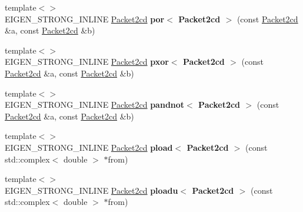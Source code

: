 \begin{DoxyCompactItemize}
\item 
\mbox{\label{namespace_eigen_1_1internal_a4d3f230cbe99c22bea02ad08eef996dc}} 
{\footnotesize template$<$$>$ }\\E\+I\+G\+E\+N\+\_\+\+S\+T\+R\+O\+N\+G\+\_\+\+I\+N\+L\+I\+NE \hyperlink{struct_eigen_1_1internal_1_1_packet2cd}{Packet2cd} {\bfseries por$<$ Packet2cd $>$} (const \hyperlink{struct_eigen_1_1internal_1_1_packet2cd}{Packet2cd} \&a, const \hyperlink{struct_eigen_1_1internal_1_1_packet2cd}{Packet2cd} \&b)
\item 
\mbox{\label{namespace_eigen_1_1internal_aad85473d2b77acec45ef80ca3cb8cb38}} 
{\footnotesize template$<$$>$ }\\E\+I\+G\+E\+N\+\_\+\+S\+T\+R\+O\+N\+G\+\_\+\+I\+N\+L\+I\+NE \hyperlink{struct_eigen_1_1internal_1_1_packet2cd}{Packet2cd} {\bfseries pxor$<$ Packet2cd $>$} (const \hyperlink{struct_eigen_1_1internal_1_1_packet2cd}{Packet2cd} \&a, const \hyperlink{struct_eigen_1_1internal_1_1_packet2cd}{Packet2cd} \&b)
\item 
\mbox{\label{namespace_eigen_1_1internal_a7581b24af7c62b141e9af806ea2d6f14}} 
{\footnotesize template$<$$>$ }\\E\+I\+G\+E\+N\+\_\+\+S\+T\+R\+O\+N\+G\+\_\+\+I\+N\+L\+I\+NE \hyperlink{struct_eigen_1_1internal_1_1_packet2cd}{Packet2cd} {\bfseries pandnot$<$ Packet2cd $>$} (const \hyperlink{struct_eigen_1_1internal_1_1_packet2cd}{Packet2cd} \&a, const \hyperlink{struct_eigen_1_1internal_1_1_packet2cd}{Packet2cd} \&b)
\item 
\mbox{\label{namespace_eigen_1_1internal_a6b54ca6cb2be7a7f40351bc08abe62fb}} 
{\footnotesize template$<$$>$ }\\E\+I\+G\+E\+N\+\_\+\+S\+T\+R\+O\+N\+G\+\_\+\+I\+N\+L\+I\+NE \hyperlink{struct_eigen_1_1internal_1_1_packet2cd}{Packet2cd} {\bfseries pload$<$ Packet2cd $>$} (const std\+::complex$<$ double $>$ $\ast$from)
\item 
\mbox{\label{namespace_eigen_1_1internal_a475188ba3e3012865468670d35514cad}} 
{\footnotesize template$<$$>$ }\\E\+I\+G\+E\+N\+\_\+\+S\+T\+R\+O\+N\+G\+\_\+\+I\+N\+L\+I\+NE \hyperlink{struct_eigen_1_1internal_1_1_packet2cd}{Packet2cd} {\bfseries ploadu$<$ Packet2cd $>$} (const std\+::complex$<$ double $>$ $\ast$from)

\end{DoxyCompactItemize}
